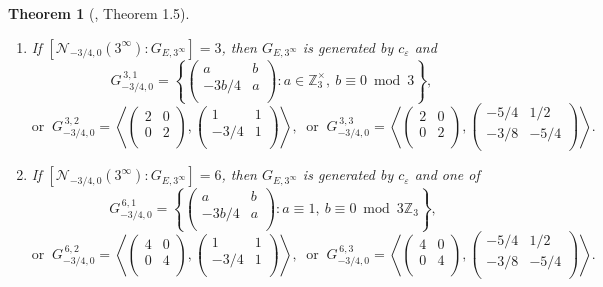 \documentclass[11pt]{amsart}
\newtheorem{thm}[defn]{Theorem}
\theoremstyle{definition}
\newcommand{\Z}{\mathbb Z}
\begin{document}
\begin{thm}[\cite{lozano-galoiscm}, Theorem 1.5]
\begin{enumerate}
\begin{enumerate}
		\item[(ii)]  If $[\mathcal{N}_{-3/4,0}(3^\infty):G_{E,3^\infty}]=3$, then $G_{E,3^\infty}$ is generated by $c_{\varepsilon}$ and 
		\[ G^{\, 3,1}_{-3/4, 0} = \left\{ \left(\begin{array}{cc} a & b\\ -3b/4 & a\\ \end{array}\right): a\in \Z_3^\times,\ b\equiv 0 \bmod 3 \right\}, \]
		\[ \text{or }\  G^{\, 3,2}_{-3/4, 0}=\left\langle \left(\begin{array}{cc}  2 & 0\\ 0 & 2\\ \end{array}\right) ,\left(\begin{array}{cc}  1 & 1\\ -3/4 & 1\\ \end{array}\right)\right\rangle,\ \text{ or } \ G^{\, 3,3}_{-3/4, 0} =\left\langle \left(\begin{array}{cc}  2 & 0\\ 0 & 2\\ \end{array}\right) ,\left(\begin{array}{cc}  -5/4 & 1/2\\ -3/8 & -5/4\\ \end{array}\right)\right\rangle. \] 
		\item[(iii)]  If $[\mathcal{N}_{-3/4,0}(3^\infty):G_{E,3^\infty}] = 6$, then $G_{E,3^\infty}$ is generated by $c_{\varepsilon}$ and one of
		\[ \ G^{\, 6,1}_{-3/4, 0}=\left\{ \left(\begin{array}{cc}  a & b\\ -3b/4 & a\\ \end{array}\right) : a\equiv 1,\ b\equiv 0 \bmod 3\Z_3 \right\}, \]
		\[ \text{or }\ G^{\, 6,2}_{-3/4, 0}=\left\langle \left(\begin{array}{cc}  4 & 0\\ 0 & 4\\ \end{array}\right) ,\left(\begin{array}{cc}  1 & 1\\ -3/4 & 1\\ \end{array}\right)\right\rangle,\ \text{ or } \  G^{\, 6,3}_{-3/4, 0}=\left\langle \left(\begin{array}{cc}  4 & 0\\ 0 & 4\\ \end{array}\right) ,\left(\begin{array}{cc}  -5/4 & 1/2\\ -3/8 & -5/4\\ \end{array}\right)\right\rangle. \]
		\end{enumerate}
	\end{enumerate}
\end{thm}
\end{document}
